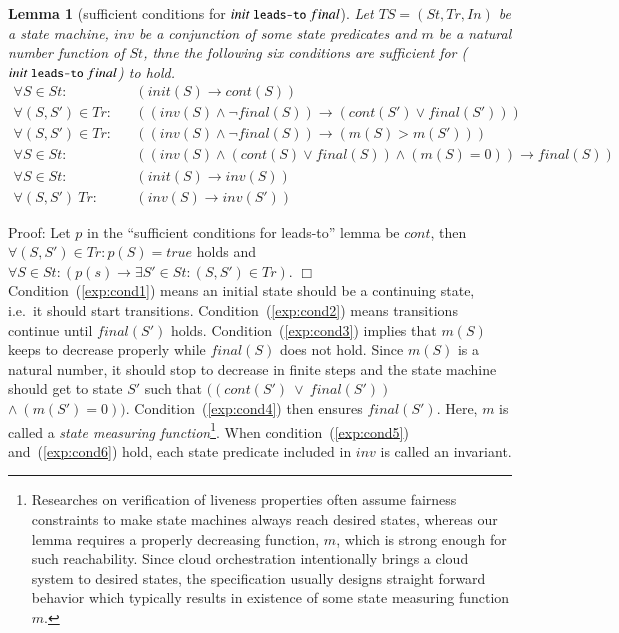 \documentclass[12pt]{report}
\newtheorem{lemma}{Lemma}
\newcommand{\ra}{\rightarrow}
\newcommand{\mbstt}[1]{\mbox{\small{\tt {#1}}}}
\begin{document}
\begin{lemma}[sufficient conditions for $init~\mbstt{leads-to}~final$]
  Let $TS=(St,Tr,In)$ be a state machine, $inv$ be a conjunction of
  some state predicates and $m$ be a natural number function of $St$,
  thne the following six conditions are sufficient for
  ($init~\mbstt{leads-to}~final$) to hold.
  \begin{eqnarray}
  \label{exp:cond1}
  \forall S\in St:&&(init(S)\ra cont(S))\\
  \label{exp:cond2}
  \forall (S,S')\in Tr:&&((inv(S)\land\neg final(S))
  \ra(cont(S')\lor final(S')))\\
  \label{exp:cond3}
  \forall (S,S')\in Tr:&&((inv(S)\land\neg final(S))\ra(m(S)> m(S')))\\
  \label{exp:cond4}
  \forall S\in St:&&((inv(S)\land (cont(S)\lor final(S))
  \land(m(S) = 0))\ra final(S))\\
  \label{exp:cond5}
  \forall S\in St:&&(init(S)\ra inv(S))\\
  \label{exp:cond6}
  \forall (S,S')\ Tr:&&(inv(S)\ra inv(S'))
  \end{eqnarray}
\end{lemma}
Proof: Let $p$ in the ``sufficient conditions for leads-to'' lemma
be $cont$, then $\forall (S,S')\in Tr:p(S)=true$ holds and
$\forall S\in St:(p(s)\ra\exists S'\in St:(S,S')\in Tr)$. $\Box$\\

Condition~(\ref{exp:cond1}) means an initial state should be a
continuing state, i.e.\ it should start
transitions. Condition~(\ref{exp:cond2}) means transitions continue
until $final(S')$ holds. Condition~(\ref{exp:cond3}) implies that
$m(S)$ keeps to decrease properly while $final(S)$ does not
hold. Since $m(S)$ is a natural number, it should stop to decrease in
finite steps and the state machine should get to state $S'$ such that
$((cont(S')\ \lor\ final(S'))$ $\land\ (m(S') = 0))$.
Condition~(\ref{exp:cond4}) then ensures $final(S')$. Here, $m$ is
called a {\it state measuring function}\footnote{Researches on
  verification of liveness properties often assume fairness
  constraints to make state machines always reach desired states,
  whereas our lemma requires a properly decreasing function, $m$,
  which is strong enough for such reachability.  Since cloud
  orchestration intentionally brings a cloud system to desired states,
  the specification usually designs straight forward behavior which
  typically results in existence of some state measuring function
  $m$.}.  When condition~(\ref{exp:cond5}) and~(\ref{exp:cond6}) hold,
each state predicate included in $inv$ is called an invariant. 
\end{document}
